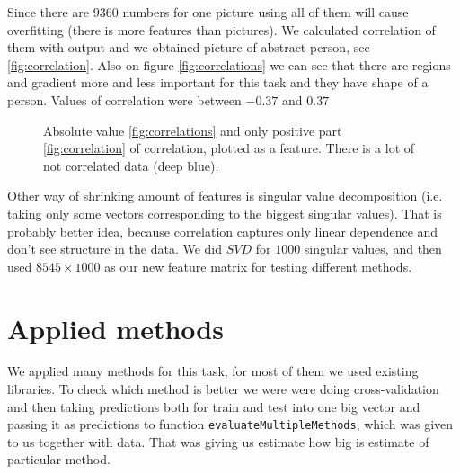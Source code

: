 \documentclass[]{article}
\begin{document}
  Since there are $9360$ numbers for one picture using all of them will cause overfitting (there is more features than pictures). We calculated correlation of them with output and we obtained picture of abstract person, see \ref{fig:correlation}.
  Also on figure \ref{fig:correlations} we can see that there are regions and gradient more and less important for this task and they have shape of a person. Values of correlation were between $-0.37$ and $0.37$
  \begin{figure}[t]
    \center
      \;\;\;
    \caption{Absolute value \ref{fig:correlations} and only positive part \ref{fig:correlation} of correlation, plotted as a feature. There is a lot of not correlated data (deep blue).}
  \end{figure}
  
  Other way of shrinking amount of features is singular value decomposition (i.e. taking only some vectors corresponding to the biggest singular values). That is probably better idea, because correlation captures only linear dependence and don't see structure in the data. We did $SVD$ for $1000$ singular values, and then used $8545\times1000$ as our new feature matrix for testing different methods.
   

\section{Applied methods}
We applied many methods for this task, for most of them we used existing libraries. To check which method is better we were were doing cross-validation and then taking predictions both for train and test into one big vector and passing it as predictions to function \verb+evaluateMultipleMethods+, which was given to us together with data. That was giving us estimate how big is estimate of particular method.
\end{document}
